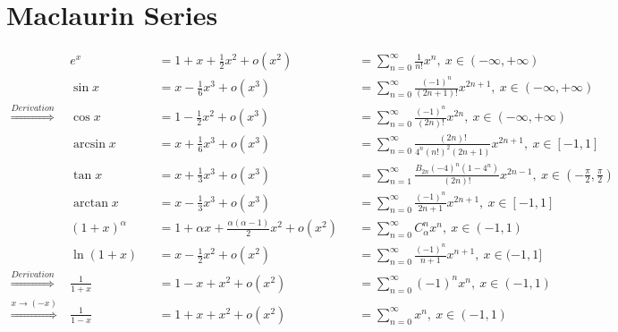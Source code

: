 \documentclass{article}
\begin{document}
	\large
	\setlength{\baselineskip}{4em}
	
	\renewcommand{\d}[1][x]{\ \text{d}#1}
	
	\section*{Maclaurin Series}
	
	\begin{align}
		& e^x & & = 1 + x + \frac{1}{2} x^2 + o(x^2) && = \sum_{n = 0}^{\infty} \frac{1}{n!} x^n,\ x \in (-\infty, +\infty)
		\\
		& \sin x & & = x - \frac{1}{6} x^3 + o(x^3) && = \sum_{n = 0}^{\infty} \frac{(-1)^n}{(2n + 1)!} x^{2n + 1},\ x \in (-\infty, +\infty)
		\\
		\stackrel{Derivation}{\Longrightarrow} \ & \cos x & & = 1 - \frac{1}{2} x^2 + o(x^3) && = \sum_{n = 0}^{\infty} \frac{(-1)^n}{(2n)!} x^{2n},\ x \in (-\infty, +\infty)
		\\
		& \arcsin x & & = x + \frac{1}{6} x^3 + o(x^3) && = \sum_{n = 0}^{\infty} \frac{(2n)!}{4^n (n!)^2 (2n + 1)} x^{2n + 1},\ x \in [-1, 1]
		\\
		& \tan x & & = x + \frac{1}{3} x^3 + o(x^3) && = \sum_{n = 1}^{\infty} \frac{B_{2n} (-4)^n (1 - 4^n)}{(2n)!} x^{2n - 1},\ x \in (-\frac{\pi}{2}, \frac{\pi}{2})
		\\
		& \arctan x & & = x - \frac{1}{3} x^3 + o(x^3) && = \sum_{n = 0}^{\infty} \frac{(-1)^n}{2n + 1} x^{2n + 1},\ x \in [-1, 1]
		\\
		& (1 + x)^\alpha & & = 1 + \alpha x + \frac{\alpha (\alpha - 1)}{2} x^2 + o(x^2) && = \sum_{n = 0}^{\infty} C_{\alpha}^{n} x^n,\ x \in (-1, 1)
		\\
		& \ln{(1 + x)} & & = x - \frac{1}{2} x^2 + o(x^2) && = \sum_{n = 0}^{\infty} \frac{(-1)^n}{n + 1} x^{n + 1},\ x \in (-1, 1]
		\\
		\stackrel{Derivation}{\Longrightarrow} \ & \frac{1}{1 + x} & & = 1 - x + x^2 + o(x^2) && = \sum_{n = 0}^{\infty} (-1)^n x^n,\ x \in (-1, 1)
		\\
		\stackrel{x \rightarrow (-x)}{\Longrightarrow} \ & \frac{1}{1 - x} & & = 1 + x + x^2 + o(x^2) && = \sum_{n = 0}^{\infty} x^n,\ x \in (-1, 1)
	\end{align}
\end{document}
